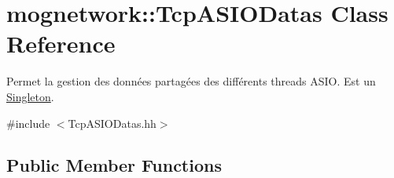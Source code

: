 \hypertarget{classmognetwork_1_1_tcp_a_s_i_o_datas}{\section{mognetwork\-:\-:Tcp\-A\-S\-I\-O\-Datas Class Reference}
\label{classmognetwork_1_1_tcp_a_s_i_o_datas}
}


Permet la gestion des données partagées des différents threads A\-S\-I\-O. Est un \hyperlink{classmognetwork_1_1_singleton}{Singleton}.  




{\ttfamily \#include $<$Tcp\-A\-S\-I\-O\-Datas.\-hh$>$}

\subsection*{Public Member Functions}
